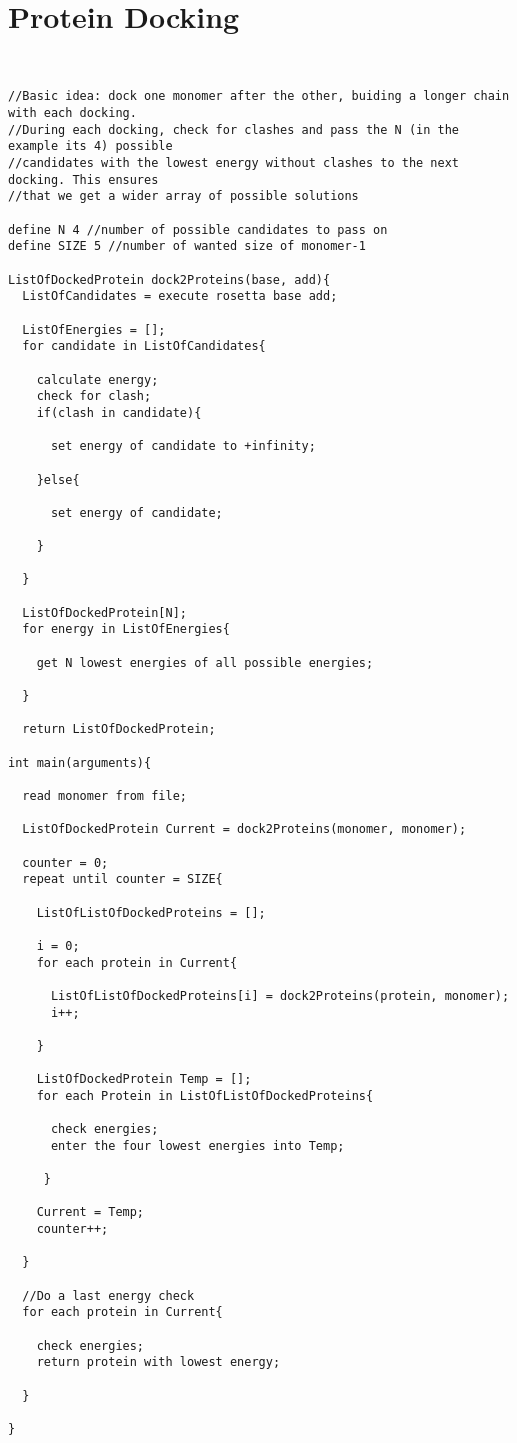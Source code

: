 \documentclass[11pt]{article}
\begin{document}
\date{\today}

\section{Protein Docking}
\begin{lstlisting}


//Basic idea: dock one monomer after the other, buiding a longer chain with each docking.
//During each docking, check for clashes and pass the N (in the example its 4) possible
//candidates with the lowest energy without clashes to the next docking. This ensures
//that we get a wider array of possible solutions

define N 4 //number of possible candidates to pass on
define SIZE 5 //number of wanted size of monomer-1

ListOfDockedProtein dock2Proteins(base, add){
  ListOfCandidates = execute rosetta base add;
  
  ListOfEnergies = [];
  for candidate in ListOfCandidates{
  
    calculate energy;
    check for clash;
    if(clash in candidate){
    
      set energy of candidate to +infinity;
      
    }else{
    
      set energy of candidate;
    
    }
  
  }
  
  ListOfDockedProtein[N];
  for energy in ListOfEnergies{
  
    get N lowest energies of all possible energies;
  
  }
  
  return ListOfDockedProtein;
  
int main(arguments){

  read monomer from file;
  
  ListOfDockedProtein Current = dock2Proteins(monomer, monomer);
  
  counter = 0;
  repeat until counter = SIZE{
  
    ListOfListOfDockedProteins = [];
  
    i = 0;
    for each protein in Current{
    
      ListOfListOfDockedProteins[i] = dock2Proteins(protein, monomer);
      i++;
      
    }
    
    ListOfDockedProtein Temp = [];
    for each Protein in ListOfListOfDockedProteins{
      
      check energies;
      enter the four lowest energies into Temp;
	
     }
    
    Current = Temp;
    counter++;
  
  }
  
  //Do a last energy check
  for each protein in Current{
  
    check energies;
    return protein with lowest energy;
  
  }
  
}

\end{lstlisting}
\end{document}
